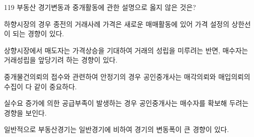 \begin{question}{119}
부동산 경기변동과 중개활동에 관한 설명으로 옳지 않은 것은?
\begin{choices}
  \item 하향시장의 경우 종전의 거래사례 가격은 새로운 매매활동에 있어 가격 설정의 상한선이 되는 경향이 있다.
  \item 상향시장에서 매도자는 가격상승을 기대하여 거래의 성립을 미루려는 반면, 매수자는 거래성립을 앞당기려 하는 경향이 있다.
  \item 중개물건의뢰의 접수와 관련하여 안정기의 경우 공인중개사는 매각의뢰와 매입의뢰의 수집이 다 같이 중요하다.
  \item 실수요 증가에 의한 공급부족이 발생하는 경우 공인중개사는 매수자를 확보해 두려는 경향을 보인다.
  \item 일반적으로 부동산경기는 일반경기에 비하여 경기의 변동폭이 큰 경향이 있다.
\end{choices}
\end{question}
